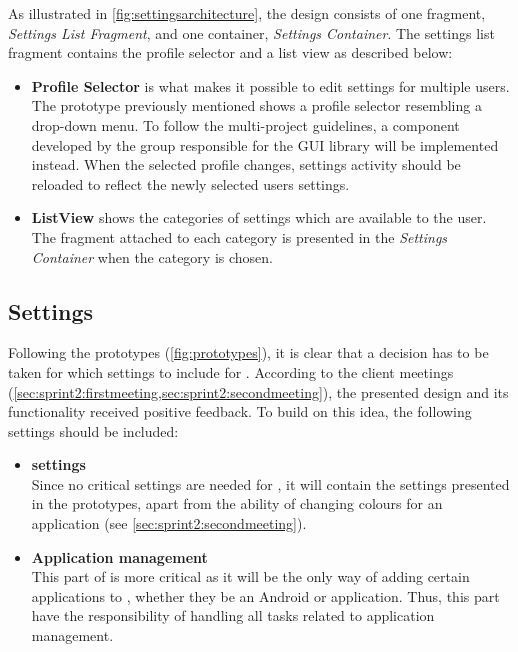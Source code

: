 As illustrated in \cref{fig:settingsarchitecture}, the design consists of one fragment, \textit{Settings List Fragment}, and one container, \textit{Settings Container}.
The settings list fragment contains the profile selector and a list view as described below:
\begin{itemize}
\item \textbf{Profile Selector} is what makes it possible to edit settings for multiple users.
The prototype previously mentioned shows a profile selector resembling a drop-down menu.
To follow the multi-project guidelines, a component developed by the group responsible for the GUI library will be implemented instead.
When the selected profile changes, settings activity should be reloaded to reflect the newly selected users settings.
\item \textbf{ListView} shows the categories of settings which are available to the user.
The fragment attached to each category is presented in the \textit{Settings Container} when the category is chosen.
\end{itemize}

\subsection{\launcher Settings}\label{sec:launchersettings}
Following the prototypes (\cref{fig:prototypes}), it is clear that a decision has to be taken for which settings to include for \launcher.
According to the client meetings (\cref{sec:sprint2:firstmeeting,sec:sprint2:secondmeeting}), the presented design and its functionality received positive feedback.
To build on this idea, the following settings should be included:

\begin{itemize}
\item \textbf{\launcher settings}\\
Since no critical settings are needed for \launcher, it will contain the settings presented in the prototypes, apart from the ability of changing colours for an application (see \cref{sec:sprint2:secondmeeting}).
\item \textbf{Application management}\\
This part of \launcher is more critical as it will be the only way of adding certain applications to \launcher, whether they be an Android or \giraf application.
Thus, this part have the responsibility of handling all tasks related to application management.
\end{itemize}

















